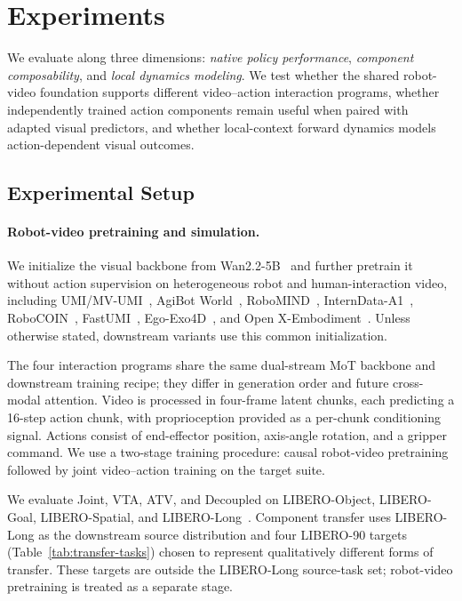 \section{Experiments}
\label{sec:experiments}


We evaluate \ours along three dimensions: \emph{native policy performance},
\emph{component composability}, and \emph{local dynamics modeling}. We test
whether the shared robot-video foundation supports different video--action
interaction programs, whether independently trained action components remain
useful when paired with adapted visual predictors, and whether local-context forward
dynamics models action-dependent visual outcomes.


\subsection{Experimental Setup}
\label{sec:experimental-setup}

\paragraph{Robot-video pretraining and simulation.}
We initialize the visual backbone from Wan2.2-5B~\cite{wan2025wan} and further
pretrain it without action supervision on heterogeneous robot and
human-interaction video, including UMI/MV-UMI~\cite{chi2024universal,rayyan2026mv},
AgiBot World~\cite{bu2025agibot}, RoboMIND~\cite{wu2024robomind},
InternData-A1~\cite{tian2026interndata}, RoboCOIN~\cite{wu2025robocoin},
FastUMI~\cite{zhaxizhuoma2025fastumi}, Ego-Exo4D~\cite{grauman2024ego},
and Open X-Embodiment~\cite{o2024open}.
Unless otherwise stated, downstream \ours variants use this
common initialization.


The four interaction programs share the same dual-stream
MoT backbone and downstream training recipe; they
differ in generation order and future cross-modal attention. Video is
processed in four-frame latent chunks, each predicting a 16-step action
chunk, with proprioception provided as a per-chunk conditioning signal.
Actions consist of end-effector position, axis-angle rotation, and a
gripper command. We use a two-stage training procedure: causal
robot-video pretraining followed by joint video--action training on the
target suite.


We evaluate Joint, VTA, ATV, and Decoupled on LIBERO-Object, LIBERO-Goal,
LIBERO-Spatial, and LIBERO-Long~\cite{liu2023libero}.
Component transfer uses LIBERO-Long as the downstream source
distribution and four LIBERO-90 targets (Table~\ref{tab:transfer-tasks}) chosen to represent qualitatively different forms of transfer. These targets are outside the LIBERO-Long
source-task set; robot-video pretraining is treated as a separate stage.





